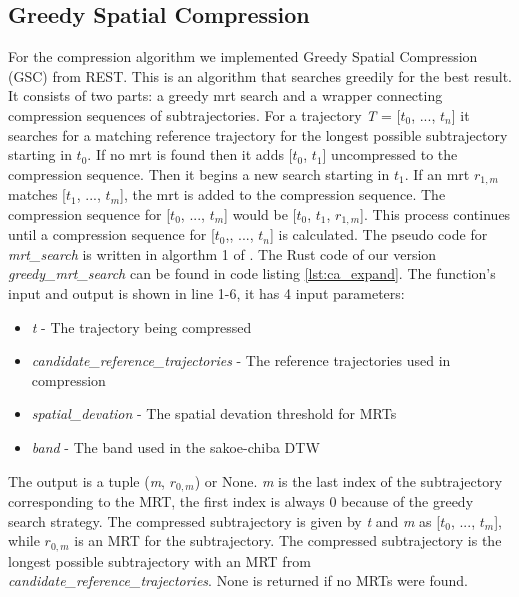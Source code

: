 \subsection{Greedy Spatial Compression}
For the compression algorithm we implemented Greedy Spatial Compression \break (GSC) from REST. This is an algorithm that searches greedily for the best result. It consists of two parts: a greedy \acrshort{mrt} search and a wrapper connecting compression sequences of subtrajectories. For a trajectory \textit{T} = [$t_0$, ..., $t_n$] it searches for a matching reference trajectory for the longest possible subtrajectory starting in $t_0$. If no \acrshort{mrt} is found then it adds [$t_0$, $t_1$] uncompressed to the compression sequence. Then it begins a new search starting in $t_1$. If an \acrshort{mrt} $r_{1,m}$ matches [$t_1$, ..., $t_m$], the \acrshort{mrt} is added to the compression sequence. The compression sequence for [$t_0$, ..., $t_m$] would be [$t_0$, $t_1$, $r_{1,m}$]. This process continues until a compression sequence for [$t_0$,, ..., $t_n$] is calculated. The pseudo code for \textit{mrt\_search} is written in algorthm 1 of \textcite{zhao2018rest}. The Rust code of our version \textit{greedy\_mrt\_search} can be found in code listing \ref{lst:ca_expand}. The function's input and output is shown in line 1-6, it has 4 input parameters:



\begin{itemize}[leftmargin=*]
    \item{\textit{t} - The trajectory being compressed}
    \item{\textit{candidate\_reference\_trajectories} - The reference trajectories used in compression}
    \item{\textit{spatial\_devation} - The spatial devation threshold for MRTs}
    \item{\textit{band} - The band used in the sakoe-chiba DTW}
\end{itemize}

The output is a tuple (\textit{m}, $r_{0,m}$) or None. \textit{m} is the last index of the subtrajectory corresponding to the MRT, the first index is always 0 because of the greedy search strategy. The compressed subtrajectory is given by \textit{t} and \textit{m} as [$t_0$, ..., $t_m$], while $r_{0,m}$ is an MRT for the subtrajectory. The compressed subtrajectory is the longest possible subtrajectory with an MRT from \textit{candidate\_reference\_trajectories}. None is returned if no MRTs were found.

